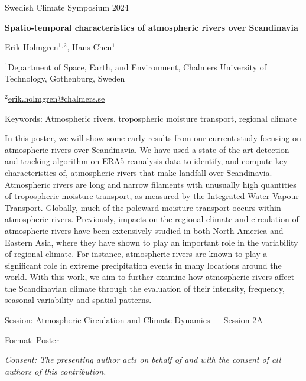 \documentclass[11pt]{article}
\begin{document}
\begin{flushright}
	Swedish Climate Symposium 2024
\end{flushright}

\begin{center}
	\bf{Spatio-temporal characteristics of atmospheric rivers over Scandinavia}
\end{center}
Erik Holmgren$^{1,2}$, Hans Chen$^1$

\bigskip
\noindent
$^1$Department of Space, Earth, and Environment, Chalmers University of Technology, Gothenburg, Sweden

\noindent
$^2$\href{mailto:erik.holmgren@chalmers.se}{erik.holmgren@chalmers.se}

\bigskip
\noindent
Keywords: Atmospheric rivers, tropospheric moisture transport, regional climate

\bigskip
\noindent
In this poster, we will show some early results from our current study focusing on atmospheric rivers over Scandinavia.
We have used a state-of-the-art detection and tracking algorithm on ERA5 reanalysis data to identify, and compute key characteristics of, atmospheric rivers that make landfall over Scandinavia.
Atmospheric rivers are long and narrow filaments with unusually high quantities of tropospheric moisture transport, as measured by the Integrated Water Vapour Transport.
Globally, much of the poleward moisture transport occurs within atmospheric rivers.
Previously, impacts on the regional climate and circulation of atmospheric rivers have been extensively studied in both North America and Eastern Asia, where they have shown to play an important role in the variability of regional climate.
For instance, atmospheric rivers are known to play a significant role in extreme precipitation events in many locations around the world.
With this work, we aim to further examine how atmospheric rivers affect the Scandinavian climate through the evaluation of their intensity, frequency, seasonal variability and spatial patterns.



\bigskip
\noindent
Session: Atmospheric Circulation and Climate Dynamics — Session 2A

\noindent
Format: Poster

\bigskip
\noindent
\emph{Consent: The presenting author acts on behalf of and with the consent of all authors of this contribution.}
\end{document}
